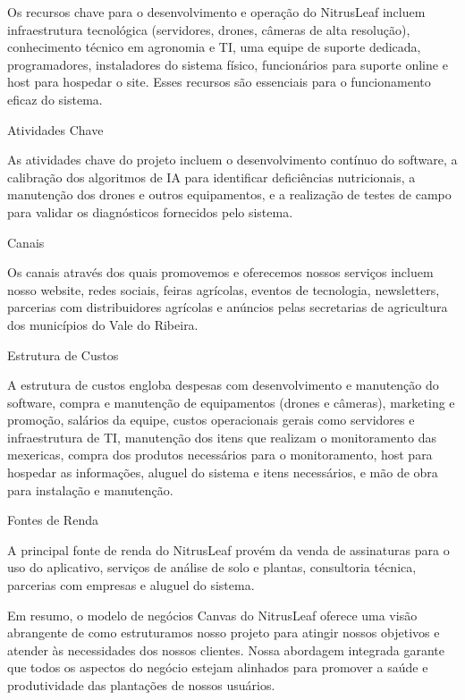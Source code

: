 \documentclass[
    a4paper,%
    12pt,%
    english,%
    brazilian,%
]{article}
\begin{document}
Os recursos chave para o desenvolvimento e operação do NitrusLeaf incluem infraestrutura tecnológica (servidores, drones, câmeras de alta resolução), conhecimento técnico em agronomia e TI, uma equipe de suporte dedicada, programadores, instaladores do sistema físico, funcionários para suporte online e host para hospedar o site. Esses recursos são essenciais para o funcionamento eficaz do sistema.

Atividades Chave

As atividades chave do projeto incluem o desenvolvimento contínuo do software, a calibração dos algoritmos de IA para identificar deficiências nutricionais, a manutenção dos drones e outros equipamentos, e a realização de testes de campo para validar os diagnósticos fornecidos pelo sistema.

Canais

Os canais através dos quais promovemos e oferecemos nossos serviços incluem nosso website, redes sociais, feiras agrícolas, eventos de tecnologia, newsletters, parcerias com distribuidores agrícolas e anúncios pelas secretarias de agricultura dos municípios do Vale do Ribeira.

Estrutura de Custos

A estrutura de custos engloba despesas com desenvolvimento e manutenção do software, compra e manutenção de equipamentos (drones e câmeras), marketing e promoção, salários da equipe, custos operacionais gerais como servidores e infraestrutura de TI, manutenção dos itens que realizam o monitoramento das mexericas, compra dos produtos necessários para o monitoramento, host para hospedar as informações, aluguel do sistema e itens necessários, e mão de obra para instalação e manutenção.

Fontes de Renda

A principal fonte de renda do NitrusLeaf provém da venda de assinaturas para o uso do aplicativo, serviços de análise de solo e plantas, consultoria técnica, parcerias com empresas e aluguel do sistema.

Em resumo, o modelo de negócios Canvas do NitrusLeaf oferece uma visão abrangente de como estruturamos nosso projeto para atingir nossos objetivos e atender às necessidades dos nossos clientes. Nossa abordagem integrada garante que todos os aspectos do negócio estejam alinhados para promover a saúde e produtividade das plantações de nossos usuários.
\end{document}
